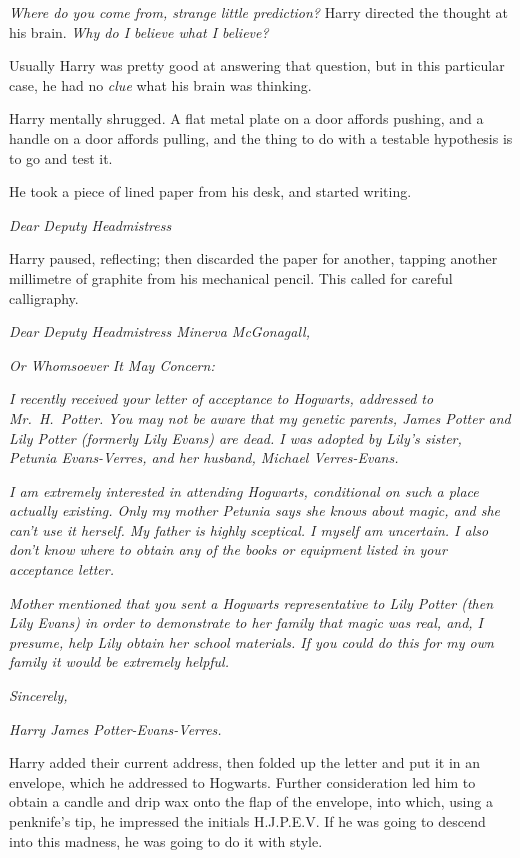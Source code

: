 \emph{Where do you come from, strange little prediction?} Harry directed the 
thought at his brain. \emph{Why do I believe what I believe?}

Usually Harry was pretty good at answering that question, but in this 
particular case, he had no \emph{clue} what his brain was thinking.

Harry mentally shrugged. A flat metal plate on a door affords pushing, and a 
handle on a door affords pulling, and the thing to do with a testable 
hypothesis is to go and test it.

He took a piece of lined paper from his desk, and started writing.

\emph{Dear Deputy Headmistress}

Harry paused, reflecting; then discarded the paper for another, tapping another 
millimetre of graphite from his mechanical pencil. This called for careful 
calligraphy.

\emph{Dear Deputy Headmistress Minerva McGonagall,}

\emph{Or Whomsoever It May Concern:}

\emph{I recently received your letter of acceptance to Hogwarts, addressed to 
Mr.~H.~Potter. You may not be aware that my genetic parents, James Potter and 
Lily Potter (formerly Lily Evans) are dead. I was adopted by Lily's sister, 
Petunia Evans-Verres, and her husband, Michael Verres-Evans.}

\emph{I am extremely interested in attending Hogwarts, conditional on such a 
place actually existing. Only my mother Petunia says she knows about magic, and 
she can't use it herself. My father is highly sceptical. I myself am uncertain. 
I also don't know where to obtain any of the books or equipment listed in your 
acceptance letter.}

\emph{Mother mentioned that you sent a Hogwarts representative to Lily Potter 
(then Lily Evans) in order to demonstrate to her family that magic was real, 
and, I presume, help Lily obtain her school materials. If you could do this for 
my own family it would be extremely helpful.}

\emph{Sincerely,}

\emph{Harry James Potter-Evans-Verres.}

Harry added their current address, then folded up the letter and put it in an 
envelope, which he addressed to Hogwarts. Further consideration led him to 
obtain a candle and drip wax onto the flap of the envelope, into which, using a 
penknife's tip, he impressed the initials H.J.P.E.V. If he was going to descend 
into this madness, he was going to do it with style.

